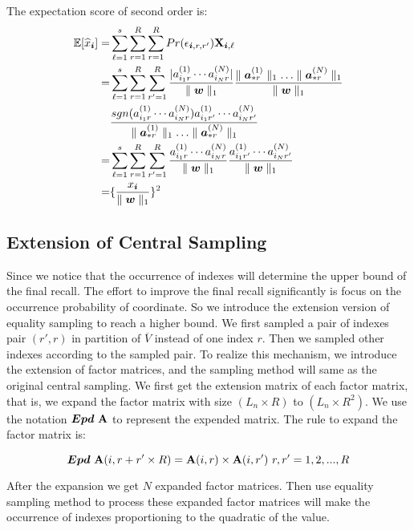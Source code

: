 \documentclass[letterpaper]{article}
\newcommand{\Sca}[3]{{#1}^{(#2)}_{i_#2#3}}%
\newcommand{\V}[1]{{\bm{{\MakeLowercase{#1}}}}}
\newcommand{\Vacol}[1]{\V{a}^{(#1)}_{*r}}
\newcommand{\M}[1]{{\bm{\mathbf{\MakeUppercase{#1}}}}}
\newcommand{\norm}[2]{\parallel#1\parallel_{#2}}
\begin{document}
The expectation score of second order is:
\begin{align*}
\mathbb{E}[\widehat{x}_{\V{i}}]=&\sum_{\ell=1}^{s}\sum_{r=1}^{R}\sum_{r=1}^{R} Pr(\epsilon_{\V{i},r,r'})\M{X}_{\V{i},\ell}\\
=& \sum_{\ell=1}^{s}\sum_{r=1}^{R}\sum_{r'=1}^{R} \frac{|\Sca{a}{1}{r}\cdots\Sca{a}{N}{r}|}{\norm{\V{W}}{1}}
\frac{\norm{\Vacol{1}}{1}\ldots\norm{\Vacol{N}}{1}}{\norm{\V{W}}{1}}\\
&\frac{sgn(\Sca{a}{1}{r}\cdots\Sca{a}{N}{r})\Sca{a}{1}{r'}\cdots\Sca{a}{N}{r'}}{ \norm{\Vacol{1}}{1}\ldots\norm{\Vacol{N}}{1}}\\
=& \sum_{\ell=1}^{s}\sum_{r=1}^{R}\sum_{r'=1}^{R} \frac{\Sca{a}{1}{r}\cdots\Sca{a}{N}{r}}{\norm{\V{W}}{1}}\frac{\Sca{a}{1}{r'}\cdots\Sca{a}{N}{r'}}{\norm{\V{W}}{1}}\\
=& \{\frac{x_{\V{i}}}{\norm{\V{w}}{1}}\}^2
\end{align*}



\subsection{Extension of Central Sampling}

Since we notice that the occurrence of indexes will determine the upper bound of the final recall. The effort to improve the final recall significantly is focus on the occurrence probability of coordinate. So we introduce the extension version of equality sampling to reach a higher bound. We first sampled a pair of indexes pair $(r',r)$ in partition of $\overline{V}$ instead of one index $r$. Then we sampled other indexes according to the sampled pair. To realize this mechanism, we introduce the extension of factor matrices, and the sampling method will same as the original central sampling. We first get the extension matrix of each factor matrix, that is, we expand the factor matrix with size $(L_n \times R)$ to $(L_n \times R^2)$. We use the notation $\bm{Epd}\ \M{A}$ to represent the expended matrix. The rule to expand the factor matrix is:

\[
\bm{Epd}\ \M{A}(i,r+r'\times R) = \M{A}(i,r)\times \M{A}(i,r')\  r,r' = {1,2,...,R}
\]

After the expansion we get $N$ expanded factor matrices. Then use equality sampling method to process these expanded factor matrices will make the occurrence of indexes proportioning to the quadratic of the value.
\end{document}
